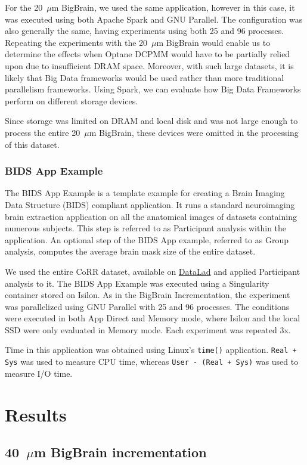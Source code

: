 \documentclass[conference]{IEEEtran}
\newcommand{\bigbrain}{BigBrain\xspace}
\begin{document}
For the 20~$\mu$m \bigbrain, we used the same application, however in this case, it was executed
using both Apache Spark and GNU Parallel. The configuration was also generally the same, having 
experiments using both 25 and 96 processes. Repeating the experiments with the 20~$\mu$m BigBrain would enable
us to determine the effects when Optane DCPMM would have to be partially relied upon due to insufficient DRAM
space. Moreover, with such large datasets, it is likely that Big Data frameworks would be used rather than
more traditional parallelism frameworks. Using Spark, we can evaluate how Big Data Frameworks perform on
different storage devices.

Since storage was limited on DRAM and local disk and was not large enough to process the entire
20~$\mu$m \bigbrain, these devices were omitted in the processing of this dataset. 

\subsubsection{BIDS App Example}

The BIDS App Example is a template example for creating a Brain Imaging Data Structure (BIDS)
compliant application. It runs a standard neuroimaging brain extraction application 
on all the anatomical images of datasets containing numerous subjects. This step is 
referred to as Participant analysis within the application. An optional
step of the BIDS App example, referred to as Group analysis, computes the average brain
mask size of the entire dataset.

We used the entire CoRR dataset, available on \href{https://www.datalad.org/}{DataLad} and
applied Participant analysis to it. The BIDS App Example was executed using a Singularity container stored on
Isilon. As in the BigBrain Incrementation, the experiment was parallelized 
using GNU Parallel with 25 and 96 processes. The conditions were executed in both App Direct and Memory mode,
where Isilon and the local SSD were only evaluated in Memory mode. Each experiment was repeated 3x.

Time in this application was obtained using Linux's \texttt{time()} application.
\texttt{Real + Sys} was used to measure CPU time,
whereas \texttt{User - (Real + Sys)} was used to measure
I/O time.
\section{Results}

\subsection{40~$\mu$m \bigbrain incrementation}
\end{document}
